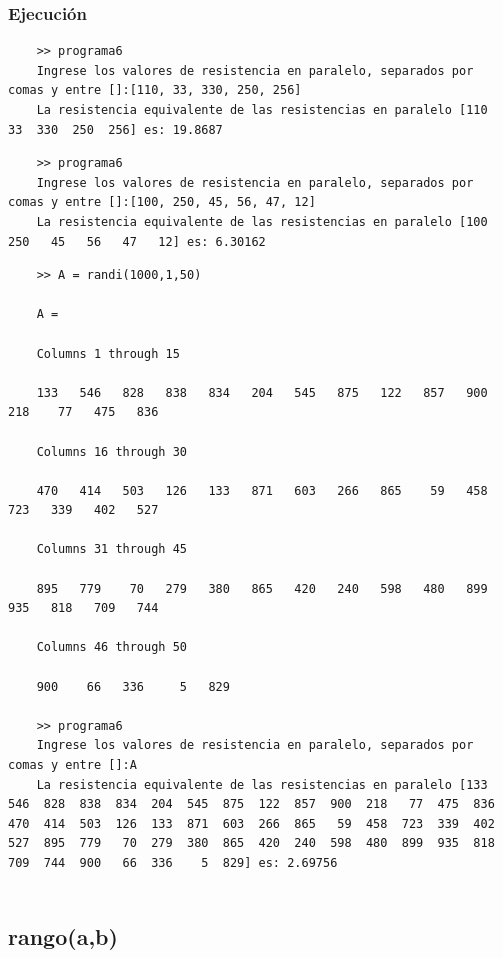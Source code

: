 \documentclass{article}
\begin{document}
	\subsubsection{Ejecución}
	
	\begin{lstlisting}
	>> programa6
	Ingrese los valores de resistencia en paralelo, separados por comas y entre []:[110, 33, 330, 250, 256]
	La resistencia equivalente de las resistencias en paralelo [110   33  330  250  256] es: 19.8687
	\end{lstlisting}
	
	\begin{lstlisting}
	>> programa6
	Ingrese los valores de resistencia en paralelo, separados por comas y entre []:[100, 250, 45, 56, 47, 12]
	La resistencia equivalente de las resistencias en paralelo [100  250   45   56   47   12] es: 6.30162
	\end{lstlisting}
	
	\begin{lstlisting}
	>> A = randi(1000,1,50)
	
	A =
	
	Columns 1 through 15
	
	133   546   828   838   834   204   545   875   122   857   900   218    77   475   836
	
	Columns 16 through 30
	
	470   414   503   126   133   871   603   266   865    59   458   723   339   402   527
	
	Columns 31 through 45
	
	895   779    70   279   380   865   420   240   598   480   899   935   818   709   744
	
	Columns 46 through 50
	
	900    66   336     5   829
	
	>> programa6
	Ingrese los valores de resistencia en paralelo, separados por comas y entre []:A
	La resistencia equivalente de las resistencias en paralelo [133  546  828  838  834  204  545  875  122  857  900  218   77  475  836  470  414  503  126  133  871  603  266  865   59  458  723  339  402  527  895  779   70  279  380  865  420  240  598  480  899  935  818  709  744  900   66  336    5  829] es: 2.69756
	
	\end{lstlisting}
	\newpage
	
	\subsection{rango(a,b)}
	
\end{document}
